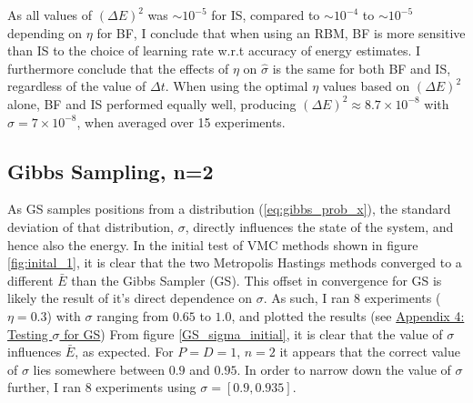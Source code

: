 \documentclass[%
oneside,                 %
final,                   %
10pt]{article}
\begin{document}
As all values of $(\Delta E)^2$ was $\sim 10^{-5}$ for IS, compared to $\sim 10^{-4}$ to $\sim 10^{-5}$ depending on $\eta$ for BF, I conclude that when using an RBM, BF is more sensitive than IS to the choice of learning rate w.r.t accuracy of energy estimates. I furthermore conclude that the effects of $\eta$  on $\hat \sigma$ is the same for both BF and IS, regardless of the value of $\Delta t$. 
When using the optimal $\eta$ values based on $(\Delta E)^2$ alone, BF and IS performed equally well, producing $(\Delta E)^2 \approx 8.7 \times 10^{-8}$ with $\hat \sigma = 7 \times 10^{-8}$, when averaged over 15 experiments.

\subsection{Gibbs Sampling, n=2}
As GS samples positions from a distribution (\eqref{eq:gibbs_prob_x}), the standard deviation of that distribution, $\sigma$, directly influences the state of the system, and hence also the energy. In the initial test of VMC methods shown in figure \ref{fig:inital_1}, it is clear that the two Metropolis Hastings methods converged to a different $\bar E$ than the Gibbs Sampler (GS). This offset in convergence for GS is likely the result of it's direct dependence on $\sigma$. As such, I ran $8$ experiments ($\eta=0.3$) with $\sigma$ ranging from $0.65$ to $1.0$, and plotted the results (see \hyperref[APP_4]{Appendix 4: Testing $\sigma$ for GS}) From figure \ref{GS_sigma_initial}, it is clear that the value of $\sigma$ influences $\bar E$, as expected. For $P=D=1$, $n=2$ it appears that the correct value of $\sigma$ lies somewhere between $0.9$ and $0.95$. In order to narrow down the value of $\sigma$ further, I ran $8$ experiments using $\sigma=[0.9,0.935]$.
 
\end{document}
